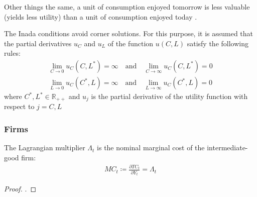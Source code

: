 \documentclass[../thesis.tex]{subfiles}
\begin{document}
\begin{definition}
	
	Other things the same, a unit of consumption enjoyed tomorrow is less valuable (yields less utility) than a unit of consumption enjoyed today \cite[Lecture 2, p.1]{solis-garcia_ucb_2022}.
	
\end{definition}


\begin{definition} \label{def:Inada Condition}
	The Inada conditions \cite{inada_two-sector_1963} avoid corner solutions. For this purpose, it is assumed that the partial derivatives $u_C$ and $u_L$ of the function $u(C, L)$ satisfy the following rules:
	\begin{align}
		\lim_{C\to 0} u_C(C,L^\ast) = \infty \quad \text{and} \quad
		\lim_{C\to \infty} u_C(C,L^\ast) = 0 \\
		\lim_{L\to 0} u_C(C^\ast,L) = \infty \quad \text{and} \quad
		\lim_{L\to \infty} u_C(C^\ast,L) = 0 \nonumber
	\end{align}
	where $C^\ast,L^\ast \in \mathbb{R}_{++}$ and $u_j$ is the partial derivative of the utility function with respect to $j=C,L$ \cite[Lecture 1, p.2]{solis-garcia_ucb_2022}
\end{definition}


\begin{definition}
	\cite[Lecture 4, p.4]{solis-garcia_ucb_2022}
\end{definition}


\subsubsection*{Firms}


\begin{lemma}\label{lemma:marginal-cost}
	The Lagrangian multiplier $\Lambda_t$ is the nominal marginal cost of the intermediate-good firm:
	\begin{align}
		MC_t \coloneq \frac{\partial TC_t}{\partial Y_t} = \Lambda_t
	\end{align}
	
	\begin{proof}
		\textcite[p.449]{simon_mathematics_1994}.
	\end{proof}
	
\end{lemma}
\end{document}
